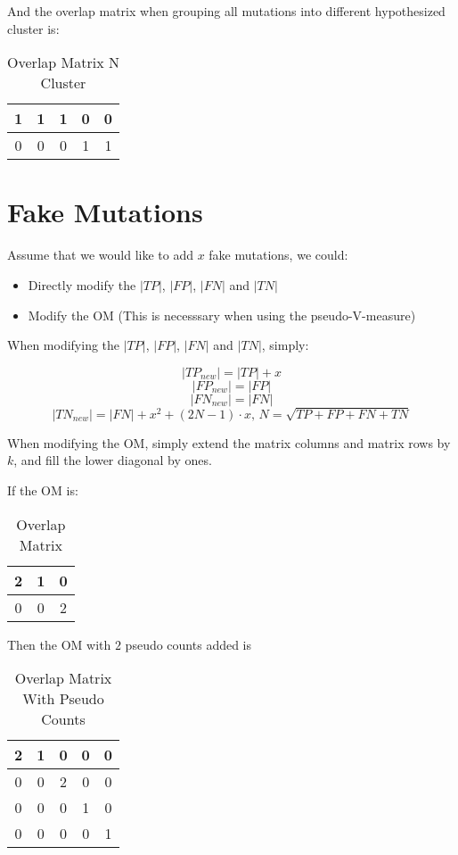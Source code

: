 \documentclass[a4paper, 11pt]{article}
\begin{document}
And the overlap matrix when grouping all mutations into different hypothesized cluster is:

\begin{center}
    \begin{table}[ht]
    \centering
    \begin{tabular}{||c c c c c||}
    \hline
    1 & 1 & 1 & 0 & 0\\
    \hline
    0 & 0 & 0 & 1 & 1\\
    \hline
    \end{tabular}
    \caption{Overlap Matrix N Cluster}
    \label{table:om}
    \end{table}
\end{center}

\section*{Fake Mutations}
Assume that we would like to add $x$ fake mutations, we could:
\begin{itemize}
\item Directly modify the $|TP|$, $|FP|$, $|FN|$ and $|TN|$
\item Modify the OM (This is necesssary when using the pseudo-V-measure)
\end{itemize}
When modifying the $|TP|$, $|FP|$, $|FN|$ and $|TN|$, simply:

$$|TP_{new}| = |TP| + x $$
$$|FP_{new}| = |FP|$$
$$|FN_{new}| = |FN|$$
$$|TN_{new}| = |FN| + x^2 + (2N-1)\cdot x,\,N = \sqrt {TP + FP + FN +TN}$$

When modifying the OM, simply extend the matrix columns and matrix rows by $k$, and fill the lower diagonal by ones.

If the OM is:
\begin{center}
    \begin{table}[ht]
    \centering
    \begin{tabular}{||c c c||}
    \hline
    2 & 1 & 0\\
    \hline
    0 & 0 & 2\\
    \hline
    \end{tabular}
    \caption{Overlap Matrix}
    \label{table:om}
    \end{table}
\end{center}

Then the OM with $2$ pseudo counts added is 
\begin{center}
    \begin{table}[ht]
    \centering
    \begin{tabular}{||c c c c c||}
    \hline
    2 & 1 & 0 & 0 & 0\\
    \hline
    0 & 0 & 2 & 0 & 0\\
    \hline
    0 & 0 & 0 & 1 & 0\\
    \hline
    0 & 0 & 0 & 0 & 1\\
    \hline
    \end{tabular}
    \caption{Overlap Matrix With Pseudo Counts}
    \label{table:om}
    \end{table}
\end{center}
\end{document}
